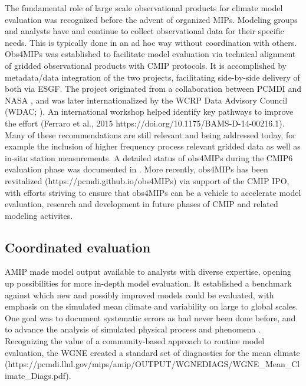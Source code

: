\documentclass[gmd, preprint]{copernicus}
\begin{document}
The fundamental role of large scale observational products for climate model evaluation was recognized before the advent of organized MIPs. Modeling groups and analysts have and continue to collect observational data for their specific needs. This is typically done in an ad hoc way without coordination with others.  Obs4MIPs was established to facilitate model evaluation via technical alignment of gridded observational products with CMIP protocols. It is accomplished by metadata/data integration of the two projects, facilitating side-by-side delivery of both via ESGF. The project originated from a collaboration between PCMDI and NASA \citep{gleckler_improving_2011}, and was later internationalized by the WCRP Data Advisory Council (WDAC; \citep{teixeira_satellite_2014}). An international workshop helped identify key pathways to improve the effort (Ferraro et al., 2015 https://doi.org/10.1175/BAMS-D-14-00216.1).  Many of these recommendations are still relevant and being addressed today, for example the inclusion of higher frequency process relevant gridded data as well as in-situ station measurements. A detailed status of obs4MIPs during the CMIP6 evaluation phase was documented in \citep{waliser_observations_2020}. More recently, obs4MIPs has been revitalized (https://pcmdi.github.io/obs4MIPs) via support of the CMIP IPO, with efforts striving to ensure that obs4MIPs can be a vehicle to accelerate model evaluation, research and development in future phases of CMIP and related modeling activites.    


\subsection{Coordinated evaluation}
\label{sec:CMIP6SupportingProjects-CoordEval}

AMIP made model output available to analysts with diverse expertise, opening up possibilities for more in-depth model evaluation.   It established a benchmark against which new and possibly improved models could be evaluated, with emphasis on the simulated mean climate and variability on large to global scales. One goal was to document systematic errors as had never been done before, and to advance the analysis of simulated physical process and phenomena \citep{gates_ams_1992}.  Recognizing the value of a community-based approach to routine model evaluation, the WGNE created a standard set of diagnostics for the mean climate (https://pcmdi.llnl.gov/mips/amip/OUTPUT/WGNEDIAGS/WGNE_Mean_Climate_Diags.pdf).
\end{document}
